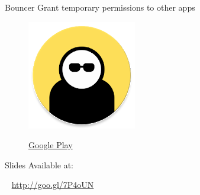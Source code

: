 \documentclass[serif,14pt,color=usenames,dvipsnames]{beamer}
\begin{document}
\begin{frame}{Bouncer}
  Grant temporary permissions to other apps

  \begin{figure}
  \centering
  \includegraphics[width=0.4\linewidth]{imgs/bouncer}

  \href{https://play.google.com/store/apps/details?id=com.samruston.permission}{Google
  Play }
  \end{figure}

\end{frame}


\begin{frame}{Slides}
Available at:
\begin{block}{~}
  \url{http://goo.gl/7P4oUN}
\end{block}
\end{frame}
\end{document}
